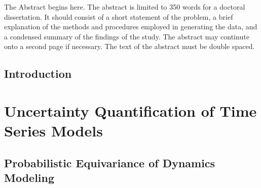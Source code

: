 \documentclass[12pt]{ucsddissertation}
\begin{document}


\begin{dissertationabstract}
The Abstract begins here. The abstract is limited to 350 words for a
doctoral dissertation. It should consist of a short statement of the
problem, a brief explanation of the methods and procedures employed in
generating the data, and a condensed summary of the findings of the
study. The abstract may continute onto a second page if necessary. The
text of the abstract must be double spaced.
\end{dissertationabstract}

\mainmatter


\chapter{Introduction}




\part{Uncertainty Quantification of Time Series Models}

\chapter{Probabilistic Equivariance of Dynamics Modeling}

\end{document}
